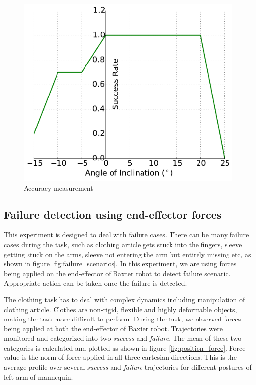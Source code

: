 \documentclass[sigconf]{acmart}
\begin{document}
\begin{figure}
	\centering
	\includegraphics[width=\linewidth]{success_rate}
	\caption{Accuracy measurement}
	\label{fig:accuracy}
\end{figure}

\subsection{Failure detection using end-effector forces}
This experiment is designed to deal with failure cases. There can be many failure cases during the task, such as clothing article gets stuck into the fingers, sleeve getting stuck on the arms, sleeve not entering the arm but entirely missing etc, as shown in figure \ref{fig:failure_scenarios}. In this experiment, we are using forces being applied on the end-effector of Baxter robot to detect failure scenario. Appropriate action can be taken once the failure is detected.

The clothing task has to deal with complex dynamics including manipulation of clothing article. Clothes are non-rigid, flexible and highly deformable objects, making the task more difficult to perform. During the task, we observed forces being applied at both the end-effector of Baxter robot. Trajectories were monitored and categorized into two \textit{success} and \textit{failure}. The mean of these two categories is calculated and plotted as shown in figure \ref{fig:position_force}. Force value is the norm of force applied in all three cartesian directions. This is the average profile over several \textit{success} and \textit{failure} trajectories for different postures of left arm of mannequin. 
\end{document}
